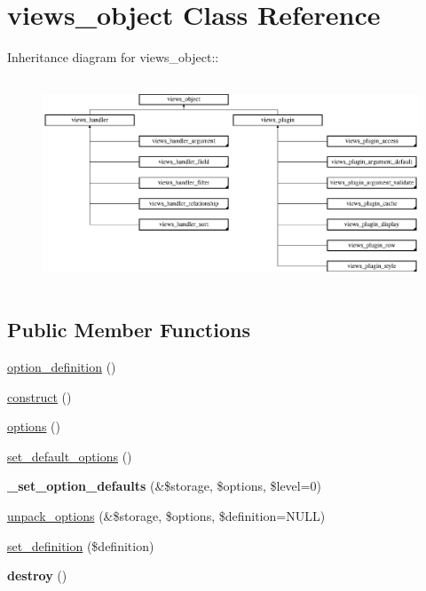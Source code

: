 \hypertarget{classviews__object}{
\section{views\_\-object Class Reference}
\label{classviews__object}
}
Inheritance diagram for views\_\-object::\begin{figure}[H]
\begin{center}
\leavevmode
\includegraphics[height=6.2069cm]{classviews__object}
\end{center}
\end{figure}
\subsection*{Public Member Functions}
\begin{CompactItemize}
\item 
\hyperlink{classviews__object_b0753d0001c8c9ff98beee696b4516ba}{option\_\-definition} ()
\item 
\hyperlink{classviews__object_6583d6be7e59dd1e39056e320ea2c2d4}{construct} ()
\item 
\hyperlink{classviews__object_894c01006e88dee15ef867272d22b3ee}{options} ()
\item 
\hyperlink{classviews__object_9f3d363b8751bfc945cc29bcf43b44e8}{set\_\-default\_\-options} ()
\item 
\hypertarget{classviews__object_e45628aa5cbfbb29fcc17ffaf114a4bd}{
\textbf{\_\-set\_\-option\_\-defaults} (\&\$storage, \$options, \$level=0)}
\label{classviews__object_e45628aa5cbfbb29fcc17ffaf114a4bd}

\item 
\hyperlink{classviews__object_1979b404c08604c5fd45dc5ab6eaebe3}{unpack\_\-options} (\&\$storage, \$options, \$definition=NULL)
\item 
\hyperlink{classviews__object_43e41e54bd99737667224d8d3a0bdc7f}{set\_\-definition} (\$definition)
\item 
\hypertarget{classviews__object_9ec270afabb44bb0ea3b2128d07cf723}{
\textbf{destroy} ()}
\label{classviews__object_9ec270afabb44bb0ea3b2128d07cf723}

\end{CompactItemize}
